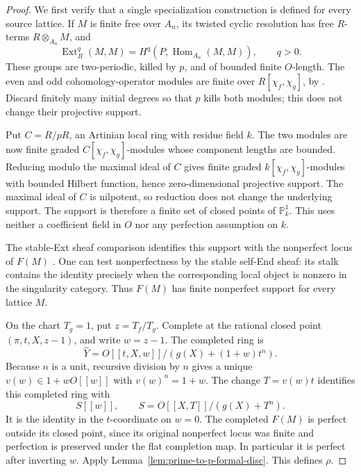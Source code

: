 \begin{proof}
We first verify that a single specialization construction is defined
for every source lattice.  If \(M\) is finite free over \(A_n\), its
twisted cyclic resolution has free \(R\)-terms \(R\otimes_{A_n}M\),
and
\[
 \operatorname{Ext}^q_R(M,M)
  =H^q(P,\operatorname{Hom}_{A_n}(M,M)),\qquad q>0.
\]
These groups are two-periodic, killed by \(p\), and of bounded finite
\(O\)-length.  The even and odd cohomology-operator modules are finite
over \(R[\chi_f,\chi_g]\), by
\citet[Remark 3.19, p.~17]{BurkeWalker2012}.  Discard finitely many
initial degrees so that \(p\) kills both modules; this does not change
their projective support.

Put \(C=R/pR\), an Artinian local ring with residue field \(k\).
The two modules are now finite graded \(C[\chi_f,\chi_g]\)-modules
whose component lengths are bounded.  Reducing modulo the maximal
ideal of \(C\) gives finite graded \(k[\chi_f,\chi_g]\)-modules with
bounded Hilbert function, hence zero-dimensional projective support.
The maximal ideal of \(C\) is nilpotent, so reduction does not change
the underlying support.  The support is therefore a finite set of
closed points of \(\mathbb P^1_k\).  This uses neither a coefficient
field in \(O\) nor any perfection assumption on \(k\).

The stable-Ext sheaf comparison identifies this support with the
nonperfect locus of \(F(M)\)
\citep[Corollaries 3.18 and 3.20, pp.~17--18;
the end of Section 8.1, pp.~33--34]{BurkeWalker2012}.
One can test nonperfectness by the stable self-End sheaf: its stalk
contains the identity precisely when the corresponding local object
is nonzero in the singularity category.  Thus \(F(M)\) has finite
nonperfect support for every lattice \(M\).

On the chart \(T_g=1\), put \(z=T_f/T_g\).  Complete at the rational
closed point \((\pi,t,X,z-1)\), and write \(w=z-1\).  The completed
ring is
\[
 \widehat Y=O[[t,X,w]]/(g(X)+(1+w)t^n).
\]
Because \(n\) is a unit, recursive division by \(n\) gives a unique
\(v(w)\in1+wO[[w]]\) with \(v(w)^n=1+w\).
The change \(T=v(w)t\) identifies this completed ring with
\[
 S[[w]],\qquad S=O[[X,T]]/(g(X)+T^n).
\]
It is the identity in the \(t\)-coordinate on \(w=0\).
The completed \(F(M)\) is perfect outside its closed point, since
its original nonperfect locus was finite and perfection is preserved
under the flat completion map.  In particular it is perfect after
inverting \(w\).  Apply Lemma~\ref{lem:prime-to-p-formal-disc}.
This defines \(\rho\).


\end{proof}

